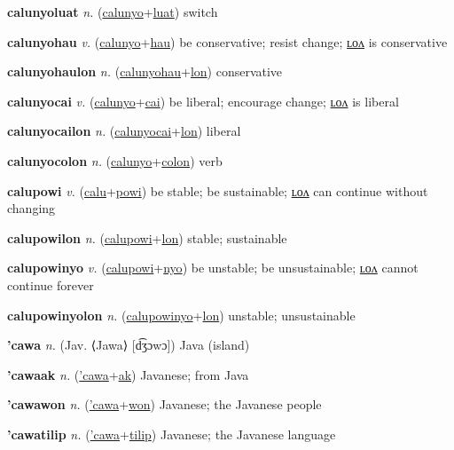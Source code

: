 \textbf{\hypertarget{calunyoluat}{calunyoluat}} \textit{n.} (\hyperlink{calunyo}{calunyo}+\allowbreak \hyperlink{luat}{luat})
switch

\textbf{\hypertarget{calunyohau}{calunyohau}} \textit{v.} (\hyperlink{calunyo}{calunyo}+\allowbreak \hyperlink{hau}{hau})
be conservative; resist change; \hyperlink{calunyohaulon}{ʟᴏᴧ} is conservative

\textbf{\hypertarget{calunyohaulon}{calunyohaulon}} \textit{n.} (\hyperlink{calunyohau}{calunyohau}+\allowbreak \hyperlink{lon}{lon})
conservative

\textbf{\hypertarget{calunyocai}{calunyocai}} \textit{v.} (\hyperlink{calunyo}{calunyo}+\allowbreak \hyperlink{cai}{cai})
be liberal; encourage change; \hyperlink{calunyocailon}{ʟᴏᴧ} is liberal

\textbf{\hypertarget{calunyocailon}{calunyocailon}} \textit{n.} (\hyperlink{calunyocai}{calunyocai}+\allowbreak \hyperlink{lon}{lon})
liberal

\textbf{\hypertarget{calunyocolon}{calunyocolon}} \textit{n.} (\hyperlink{calunyo}{calunyo}+\allowbreak \hyperlink{colon}{colon})
verb

\textbf{\hypertarget{calupowi}{calupowi}} \textit{v.} (\hyperlink{calu}{calu}+\allowbreak \hyperlink{powi}{powi})
be stable; be sustainable; \hyperlink{calupowilon}{ʟᴏᴧ} can continue without changing

\textbf{\hypertarget{calupowilon}{calupowilon}} \textit{n.} (\hyperlink{calupowi}{calupowi}+\allowbreak \hyperlink{lon}{lon})
stable; sustainable

\textbf{\hypertarget{calupowinyo}{calupowinyo}} \textit{v.} (\hyperlink{calupowi}{calupowi}+\allowbreak \hyperlink{nyo}{nyo})
be unstable; be unsustainable; \hyperlink{calupowinyolon}{ʟᴏᴧ} cannot continue forever

\textbf{\hypertarget{calupowinyolon}{calupowinyolon}} \textit{n.} (\hyperlink{calupowinyo}{calupowinyo}+\allowbreak \hyperlink{lon}{lon})
unstable; unsustainable

\textbf{\hypertarget{'cawa}{'cawa}} \textit{n.} (Jav. ⟨Jawa⟩ [d͡ʒɔwɔ])
Java (island)

\textbf{\hypertarget{'cawaak}{'cawaak}} \textit{n.} (\hyperlink{'cawa}{'cawa}+\allowbreak \hyperlink{ak}{ak})
Javanese; from Java

\textbf{\hypertarget{'cawawon}{'cawawon}} \textit{n.} (\hyperlink{'cawa}{'cawa}+\allowbreak \hyperlink{won}{won})
Javanese; the Javanese people

\textbf{\hypertarget{'cawatilip}{'cawatilip}} \textit{n.} (\hyperlink{'cawa}{'cawa}+\allowbreak \hyperlink{tilip}{tilip})
Javanese; the Javanese language

